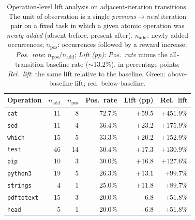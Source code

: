 \documentclass{article}
\newcommand{\tablehead}[1]{\textbf{\textcolor{narrareddeep}{#1}}}
\begin{document}
\begin{table}[t]
\centering
\caption{Operation-level lift analysis on adjacent-iteration transitions.
The unit of observation is a single \emph{previous}$\to$\emph{next}
iteration pair on a fixed task in which a given atomic operation was
\emph{newly added} (absent before, present after).
$n_{\text{add}}$: newly-added occurrences;
$n_{\text{pos}}$: occurrences followed by a reward increase;
\emph{Pos.\ rate}: $n_{\text{pos}}/n_{\text{add}}$;
\emph{Lift (pp)}: \emph{Pos.\ rate} minus the all-transition baseline rate
($\sim$$13.2\%$), in percentage points;
\emph{Rel.\ lift}: the same lift relative to the baseline.
\textcolor{liftpositive}{Green}: above-baseline lift;
\textcolor{liftnegative}{red}: below-baseline.}
\label{tab:op_lift}
\footnotesize
\setlength{\tabcolsep}{6pt}
\renewcommand{\arraystretch}{1.10}
\begin{tabular}{@{}lrrrrr@{}}
\toprule
\rowcolor{tableheadbg}
\tablehead{Operation} & \tablehead{$n_{\text{add}}$} & \tablehead{$n_{\text{pos}}$} &
\tablehead{Pos.\ rate} & \tablehead{Lift (pp)} & \tablehead{Rel.\ lift} \\
\midrule
\rowcolor{tablestripebg}
\texttt{cat}        & 11 &  8 & 72.7\% & \textcolor{liftpositive}{$+59.5$} & \textcolor{liftpositive}{$+451.9\%$} \\
\texttt{sed}        & 11 &  4 & 36.4\% & \textcolor{liftpositive}{$+23.2$} & \textcolor{liftpositive}{$+175.9\%$} \\
\rowcolor{tablestripebg}
\texttt{which}      & 15 &  5 & 33.3\% & \textcolor{liftpositive}{$+20.2$} & \textcolor{liftpositive}{$+152.9\%$} \\
\texttt{test}       & 46 & 14 & 30.4\% & \textcolor{liftpositive}{$+17.3$} & \textcolor{liftpositive}{$+130.9\%$} \\
\rowcolor{tablestripebg}
\texttt{pip}        & 10 &  3 & 30.0\% & \textcolor{liftpositive}{$+16.8$} & \textcolor{liftpositive}{$+127.6\%$} \\
\texttt{python3}    & 19 &  5 & 26.3\% & \textcolor{liftpositive}{$+13.1$} & \textcolor{liftpositive}{$+99.7\%$}  \\
\rowcolor{tablestripebg}
\texttt{strings}    &  4 &  1 & 25.0\% & \textcolor{liftpositive}{$+11.8$} & \textcolor{liftpositive}{$+89.7\%$}  \\
\texttt{pdftotext}  & 15 &  3 & 20.0\% & \textcolor{liftpositive}{$+6.8$}  & \textcolor{liftpositive}{$+51.8\%$}  \\
\rowcolor{tablestripebg}
\texttt{head}       &  5 &  1 & 20.0\% & \textcolor{liftpositive}{$+6.8$}  & \textcolor{liftpositive}{$+51.8\%$}  \\

\end{tabular}
\end{table}
\end{document}

